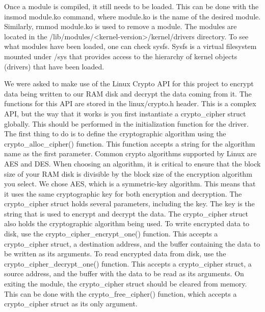 \documentclass[10pt,draftclsnofoot,onecolumn,journal,compsoc]{IEEEtran}
\begin{document}
Once a module is compiled, it still needs to be loaded. This can be done with the insmod module.ko command, where module.ko is the name of the desired module. Similarly, rmmod module.ko is used to remove a module. The modules are located in the /lib/modules/<kernel-version>/kernel/drivers directory. To see what modules have been loaded, one can check sysfs. Sysfs is a virtual filesystem mounted under /sys that provides access to the hierarchy of kernel objects (drivers) that have been loaded. \cite{Love}

We were asked to make use of the Linux Crypto API for this project to encrypt data being written to our RAM disk and decrypt the data coming from it. The functions for this API are stored in the linux/crypto.h header. This is a complex API, but the way that it works is you first instantiate a crypto\_cipher struct globally. This should be performed in the initialization function for the driver. The first thing to do is to define the cryptographic algorithm using the crypto\_alloc\_cipher() function. This function accepts a string for the algorithm name as the first parameter. Common crypto algorithms supported by Linux are AES and DES. When choosing an algorithm, it is critical to ensure that the block size of your RAM disk is divisible by the block size of the encryption algorithm you select. We chose AES, which is a symmetric-key algorithm. This means that it uses the same cryptographic key for both encryption and decryption. The crypto\_cipher struct holds several parameters, including the key. The key is the string that is used to encrypt and decrypt the data. The crypto\_cipher struct also holds the cryptographic algorithm being used. To write encrypted data to disk, use the crypto\_cipher\_encrypt\_one() function. This accepts a crypto\_cipher struct, a destination address, and the buffer containing the data to be written as its arguments. To read encrypted data from disk, use the crypto\_cipher\_decrypt\_one() function. This accepts a crypto\_cipher struct, a source address, and the buffer with the data to be read as its arguments. On exiting the module, the crypto\_cipher struct should be cleared from memory. This can be done with the crypto\_free\_cipher() function, which accepts a crypto\_cipher struct as its only argument.


\end{document}
